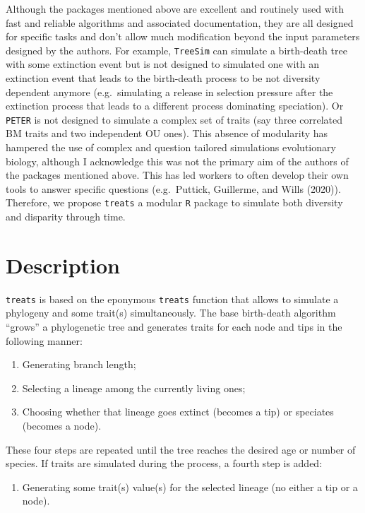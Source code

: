 \documentclass[
]{article}
\providecommand{\tightlist}{%
  \setlength{\itemsep}{0pt}\setlength{\parskip}{0pt}}
\begin{document}
Although the packages mentioned above are excellent and routinely used
with fast and reliable algorithms and associated documentation, they are
all designed for specific tasks and don't allow much modification beyond
the input parameters designed by the authors. For example,
\texttt{TreeSim} can simulate a birth-death tree with some extinction
event but is not designed to simulated one with an extinction event that
leads to the birth-death process to be not diversity dependent anymore
(e.g.~simulating a release in selection pressure after the extinction
process that leads to a different process dominating speciation). Or
\texttt{PETER} is not designed to simulate a complex set of traits (say
three correlated BM traits and two independent OU ones). This absence of
modularity has hampered the use of complex and question tailored
simulations evolutionary biology, although I acknowledge this was not
the primary aim of the authors of the packages mentioned above. This has
led workers to often develop their own tools to answer specific
questions (e.g.~Puttick, Guillerme, and Wills (2020)). Therefore, we
propose \texttt{treats} a modular \texttt{R} package to simulate both
diversity and disparity through time.

\hypertarget{description}{%
\section{Description}\label{description}}

\texttt{treats} is based on the eponymous \texttt{treats} function that
allows to simulate a phylogeny and some trait(s) simultaneously. The
base birth-death algorithm ``grows'' a phylogenetic tree and generates
traits for each node and tips in the following manner:

\begin{enumerate}
\def\labelenumi{\arabic{enumi}.}
\tightlist
\item
  Generating branch length;
\item
  Selecting a lineage among the currently living ones;
\item
  Choosing whether that lineage goes extinct (becomes a tip) or
  speciates (becomes a node).
\end{enumerate}

These four steps are repeated until the tree reaches the desired age or
number of species. If traits are simulated during the process, a fourth
step is added:

\begin{enumerate}
\def\labelenumi{\arabic{enumi}.}
\setcounter{enumi}{3}
\tightlist
\item
  Generating some trait(s) value(s) for the selected lineage (no either
  a tip or a node).
\end{enumerate}
\end{document}
